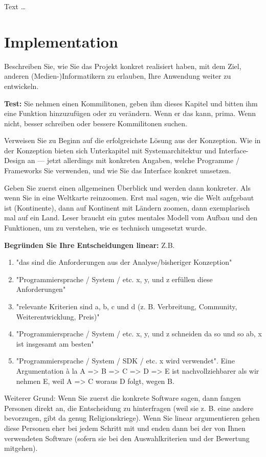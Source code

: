 \documentclass[11pt,a4paper,english]{scrreprt}
\newenvironment{comment}
  {\par\medskip
   \begingroup\color{olive}%
   }
 {\endgroup
  \medskip}
\begin{document}
Text \dots

\newpage
\chapter{Implementation}\label{chapter:implementation}
\begin{comment}
Beschreiben Sie, wie Sie das Projekt konkret realisiert haben, mit dem Ziel, anderen (Medien-)Informatikern zu erlauben, Ihre Anwendung weiter zu entwickeln.

\textbf{Test:} Sie nehmen einen Kommilitonen, geben ihm dieses Kapitel und bitten ihm eine Funktion hinzuzufügen oder zu verändern. Wenn er das kann, prima. Wenn nicht, besser schreiben oder bessere Kommilitonen suchen.

Verweisen Sie zu Beginn auf die erfolgreichste Lösung aus der Konzeption. Wie in der Konzeption bieten sich Unterkapitel mit Systemarchitektur und Interface-Design an — jetzt allerdings mit konkreten Angaben, welche Programme / Frameworks Sie verwenden, und wie Sie das Interface konkret umsetzen.

Geben Sie zuerst einen allgemeinen Überblick und werden dann konkreter. Als wenn Sie in eine Weltkarte reinzoomen. Erst mal sagen, wie die Welt aufgebaut ist (Kontinente), dann auf Kontinent mit Ländern zoomen, dann exemplarisch mal auf ein Land. Leser braucht ein gutes mentales Modell vom Aufbau und den Funktionen, um zu verstehen, wie es technisch umgesetzt wurde.

\textbf{Begründen Sie Ihre Entscheidungen linear:} Z.B.

\begin{enumerate}
    \item "das sind die Anforderungen aus der Analyse/bisheriger Konzeption"
    \item "Programmiersprache / System / etc. x, y, und z erfüllen diese Anforderungen"
    \item "relevante Kriterien sind a, b, c und d (z. B. Verbreitung, Community, Weiterentwicklung, Preis)"
    \item "Programmiersprache / System / etc. x, y, und z schneiden da so und so ab, x ist insgesamt am besten"
    \item "Programmiersprache / System / SDK / etc. x wird verwendet". Eine Argumentation à la A => B => C => D => E ist nachvollziehbarer als wir nehmen E, weil A => C woraus D folgt, wegen B.
\end{enumerate}

Weiterer Grund: Wenn Sie zuerst die konkrete Software sagen, dann fangen Personen direkt an, die Entscheidung zu hinterfragen (weil sie z. B. eine andere bevorzugen, gibt da genug Religionskriege). Wenn Sie linear argumentieren gehen diese Personen eher bei jedem Schritt mit und enden dann bei der von Ihnen verwendeten Software (sofern sie bei den Auswahlkriterien und der Bewertung mitgehen).


\end{comment}
\end{document}
